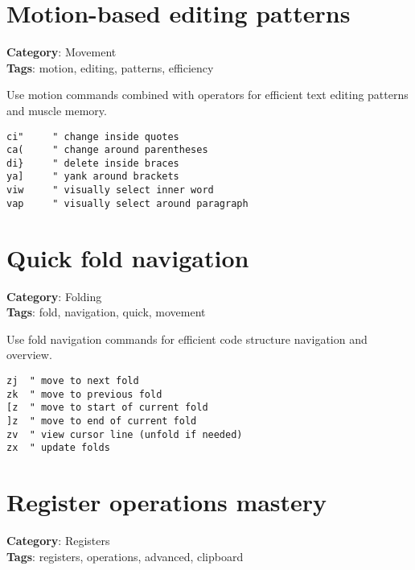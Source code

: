 {{{\section{Motion-based editing patterns}

\textbf{Category}: Movement\\ \textbf{Tags}: motion, editing, patterns, efficiency
\vspace{0.5cm}

Use motion commands combined with operators for efficient text editing patterns and muscle memory.

\begin{Exa*}{}
\begin{Verbatim}[fontsize=\footnotesize, breaklines, breakanywhere]
ci"     " change inside quotes
ca(     " change around parentheses  
di}     " delete inside braces
ya]     " yank around brackets
viw     " visually select inner word
vap     " visually select around paragraph
\end{Verbatim}
\end{Exa*}

\section{Quick fold navigation}

\textbf{Category}: Folding\\ \textbf{Tags}: fold, navigation, quick, movement
\vspace{0.5cm}

Use fold navigation commands for efficient code structure navigation and overview.

\begin{Exa*}{}
\begin{Verbatim}[fontsize=\footnotesize, breaklines, breakanywhere]
zj  " move to next fold
zk  " move to previous fold  
[z  " move to start of current fold
]z  " move to end of current fold
zv  " view cursor line (unfold if needed)
zx  " update folds
\end{Verbatim}
\end{Exa*}

\section{Register operations mastery}

\textbf{Category}: Registers\\ \textbf{Tags}: registers, operations, advanced, clipboard
\vspace{0.5cm}

}}}
